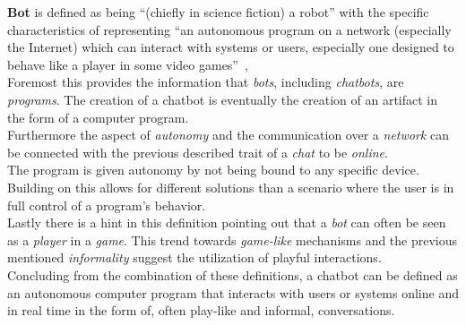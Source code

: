 \textbf{Bot} is defined as being ``(chiefly in science fiction) a robot'' with the specific characteristics of representing ``an autonomous program on a network (especially the Internet) which can interact with systems or users, especially one designed to behave like a player in some video games''~\cite{oxfordbot},
\\

Foremost this provides the information that \emph{bots}, including \emph{chatbots}, are \emph{programs}.
The creation of a chatbot is eventually the creation of an artifact in the form of a computer program.
\\

Furthermore the aspect of \emph{autonomy} and the communication over a \emph{network} can be connected with the previous described trait of a \emph{chat} to be \emph{online}.
\\
The program is given autonomy by not being bound to any specific device.
Building on this allows for different solutions than a scenario where the user is in full control of a program's behavior.
\\

Lastly there is a hint in this definition pointing out that a \emph{bot} can often be seen as a \emph{player} in a \emph{game}.
This trend towards \emph{game-like} mechanisms and the previous mentioned \emph{informality} suggest the utilization of playful interactions.
\\

Concluding from the combination of these definitions, a chatbot can be defined as an autonomous computer program that interacts with users or systems online and in real time in the form of, often play-like and informal, conversations.
